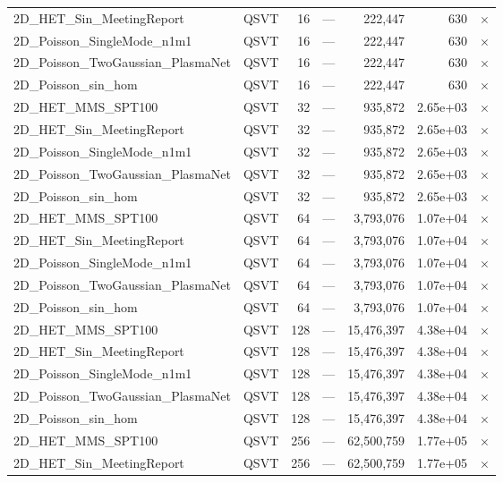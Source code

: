 \begin{table}[htbp]
\begin{tabular}{llrrrrl}
    2D\_HET\_Sin\_MeetingReport & QSVT & 16 & --- & 222,447 & 630 & $\times$ \\
    2D\_Poisson\_SingleMode\_n1m1 & QSVT & 16 & --- & 222,447 & 630 & $\times$ \\
    2D\_Poisson\_TwoGaussian\_PlasmaNet & QSVT & 16 & --- & 222,447 & 630 & $\times$ \\
    2D\_Poisson\_sin\_hom & QSVT & 16 & --- & 222,447 & 630 & $\times$ \\
    2D\_HET\_MMS\_SPT100 & QSVT & 32 & --- & 935,872 & 2.65e+03 & $\times$ \\
    2D\_HET\_Sin\_MeetingReport & QSVT & 32 & --- & 935,872 & 2.65e+03 & $\times$ \\
    2D\_Poisson\_SingleMode\_n1m1 & QSVT & 32 & --- & 935,872 & 2.65e+03 & $\times$ \\
    2D\_Poisson\_TwoGaussian\_PlasmaNet & QSVT & 32 & --- & 935,872 & 2.65e+03 & $\times$ \\
    2D\_Poisson\_sin\_hom & QSVT & 32 & --- & 935,872 & 2.65e+03 & $\times$ \\
    2D\_HET\_MMS\_SPT100 & QSVT & 64 & --- & 3,793,076 & 1.07e+04 & $\times$ \\
    2D\_HET\_Sin\_MeetingReport & QSVT & 64 & --- & 3,793,076 & 1.07e+04 & $\times$ \\
    2D\_Poisson\_SingleMode\_n1m1 & QSVT & 64 & --- & 3,793,076 & 1.07e+04 & $\times$ \\
    2D\_Poisson\_TwoGaussian\_PlasmaNet & QSVT & 64 & --- & 3,793,076 & 1.07e+04 & $\times$ \\
    2D\_Poisson\_sin\_hom & QSVT & 64 & --- & 3,793,076 & 1.07e+04 & $\times$ \\
    2D\_HET\_MMS\_SPT100 & QSVT & 128 & --- & 15,476,397 & 4.38e+04 & $\times$ \\
    2D\_HET\_Sin\_MeetingReport & QSVT & 128 & --- & 15,476,397 & 4.38e+04 & $\times$ \\
    2D\_Poisson\_SingleMode\_n1m1 & QSVT & 128 & --- & 15,476,397 & 4.38e+04 & $\times$ \\
    2D\_Poisson\_TwoGaussian\_PlasmaNet & QSVT & 128 & --- & 15,476,397 & 4.38e+04 & $\times$ \\
    2D\_Poisson\_sin\_hom & QSVT & 128 & --- & 15,476,397 & 4.38e+04 & $\times$ \\
    2D\_HET\_MMS\_SPT100 & QSVT & 256 & --- & 62,500,759 & 1.77e+05 & $\times$ \\
    2D\_HET\_Sin\_MeetingReport & QSVT & 256 & --- & 62,500,759 & 1.77e+05 & $\times$ \\

\end{tabular}
\end{table}
